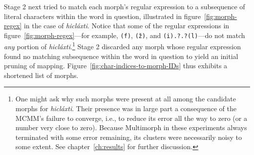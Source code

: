 Stage 2 next tried to match each morph's regular expression to a subsequence of
literal characters within the word in question, 
illustrated in figure~\ref{fig:morph-regex} %
in the case of \textit{hicl\'{a}xti}.
Notice that some of the regular expressions in figure~\ref{fig:morph-regex}---for example,
\texttt{(f)}, \texttt{(\v{z})}, and \texttt{(i).?.?(l)}---do not
match \emph{any} portion of \textit{hicl\'{a}xti}.\footnote{One might ask why such morphs were present at all among the 
candidate morphs for \textit{hicl\'{a}xti}.  Their presence was in large part a consequence of the MCMM's failure to converge, i.e., to reduce its error all the way to zero (or a number very close to zero). Because Multimorph in these experiments always terminated with some error remaining, its clusters were necessarily noisy to some extent. See chapter~\ref{ch:results} for further discussion.}
Stage 2 discarded any morph whose regular expression found no matching subsequence within the word in question to yield an initial pruning of mapping.  Figure~\ref{fig:char-indices-to-morph-IDs} thus exhibits a shortened list of morphs.

